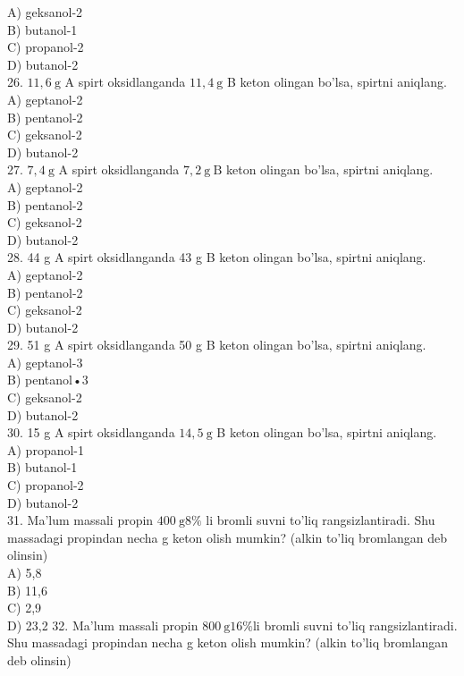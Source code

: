 A) geksanol-2\\
B) butanol-1\\
C) propanol-2\\
D) butanol-2\\
26. $11,6 \mathrm{~g}$ A spirt oksidlanganda $11,4 \mathrm{~g}$ B keton olingan bo'lsa, spirtni aniqlang.\\
A) geptanol-2\\
B) pentanol-2\\
C) geksanol-2\\
D) butanol-2\\
27. $7,4 \mathrm{~g}$ A spirt oksidlanganda $7,2 \mathrm{~g} \mathrm{~B}$ keton olingan bo'lsa, spirtni aniqlang.\\
A) geptanol-2\\
B) pentanol-2\\
C) geksanol-2\\
D) butanol-2\\
28. 44 g A spirt oksidlanganda 43 g B keton olingan bo'lsa, spirtni aniqlang.\\
A) geptanol-2\\
B) pentanol-2\\
C) geksanol-2\\
D) butanol-2\\
29. 51 g A spirt oksidlanganda 50 g B keton olingan bo'lsa, spirtni aniqlang.\\
A) geptanol-3\\
B) pentanol•3\\
C) geksanol-2\\
D) butanol-2\\
30. 15 g A spirt oksidlanganda $14,5 \mathrm{~g}$ B keton olingan bo'lsa, spirtni aniqlang.\\
A) propanol-1\\
B) butanol-1\\
C) propanol-2\\
D) butanol-2\\
31. Ma'lum massali propin $400 \mathrm{~g} 8 \%$ li bromli suvni to'liq rangsizlantiradi. Shu massadagi propindan necha g keton olish mumkin? (alkin to'liq bromlangan deb olinsin)\\
A) 5,8\\
B) 11,6\\
C) 2,9\\
D) 23,2
32. Ma'lum massali propin $800 \mathrm{~g} 16 \% \mathrm{li}$ bromli suvni to'liq rangsizlantiradi. Shu massadagi propindan necha g keton olish mumkin? (alkin to'liq bromlangan deb olinsin)\\
